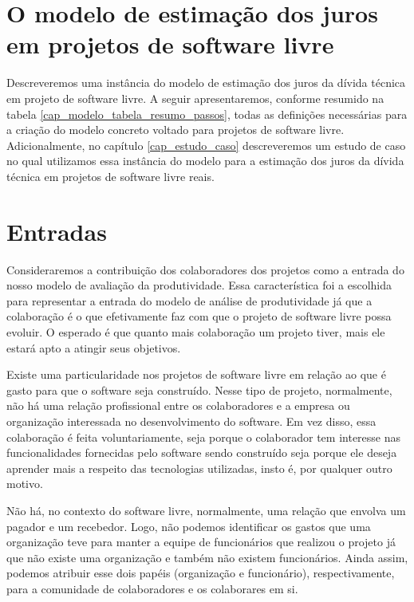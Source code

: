  
 
\section{O modelo de estimação dos juros em projetos de software livre}

 Descreveremos uma instância do modelo de estimação dos juros da dívida técnica em projeto de software livre.  A seguir apresentaremos, conforme resumido na tabela \ref{cap_modelo_tabela_resumo_passos}, todas as definições necessárias para a criação do modelo concreto voltado para projetos de software livre. Adicionalmente, no capítulo \ref{cap_estudo_caso} descreveremos um estudo de caso no qual utilizamos essa instância do modelo para a estimação dos juros da dívida técnica em projetos de software livre reais.




\section{Entradas}
\label{cap_metodo:modelos_de_entrada}

Consideraremos a contribuição dos colaboradores dos projetos como a entrada do nosso modelo de avaliação da produtividade. Essa característica foi a escolhida para representar a entrada do modelo de análise de produtividade já que a colaboração é o que efetivamente faz com que  o projeto de software livre possa evoluir. O esperado é que quanto mais colaboração um projeto tiver, mais ele estará apto a atingir seus objetivos. 

Existe uma particularidade nos projetos de software livre em relação ao que é gasto  para que o software seja construído. Nesse tipo de projeto, normalmente, não há uma relação profissional entre os colaboradores e a empresa ou organização interessada no desenvolvimento do software. Em vez disso, essa colaboração é feita voluntariamente, seja porque o colaborador tem interesse nas funcionalidades fornecidas pelo software sendo construído seja porque ele deseja aprender mais a respeito das tecnologias utilizadas, insto é, por qualquer outro motivo. 

Não há, no contexto do software livre, normalmente, uma relação que envolva um pagador e um recebedor. Logo, não podemos identificar os gastos que uma organização teve para manter a equipe de funcionários que realizou o projeto já que não existe uma organização e também não existem funcionários. Ainda assim, podemos atribuir esse dois papéis (organização e funcionário), respectivamente,  para a comunidade de colaboradores e os colaborares em si. 

